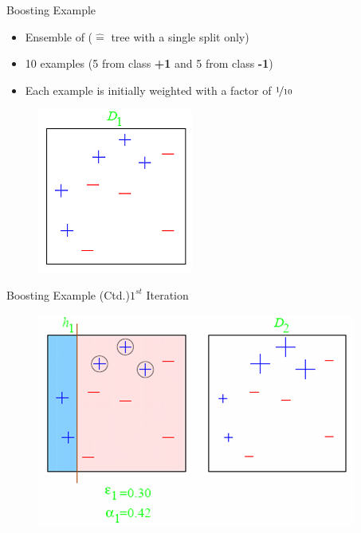 \begin{frame}{Boosting Example}{}
	\begin{itemize}
		\item Ensemble of  ($\widehat{=}$ tree with a single split only)
		\item 10 examples (5 from class \textbf{+1} and 5 from class \textbf{-1})
		\item Each example is initially weighted with a factor of $\nicefrac{1}{10}$
	\end{itemize}

	\begin{figure}
		\includegraphics[scale=0.50]{08_decision_trees/02_img/boosting_example}
	\end{figure}
\end{frame}


\begin{frame}{Boosting Example (Ctd.)}{$1^{st}$ Iteration}
	\begin{figure}
		\includegraphics[scale=0.60]{08_decision_trees/02_img/boosting_first_iteration}
	\end{figure}
\end{frame}


